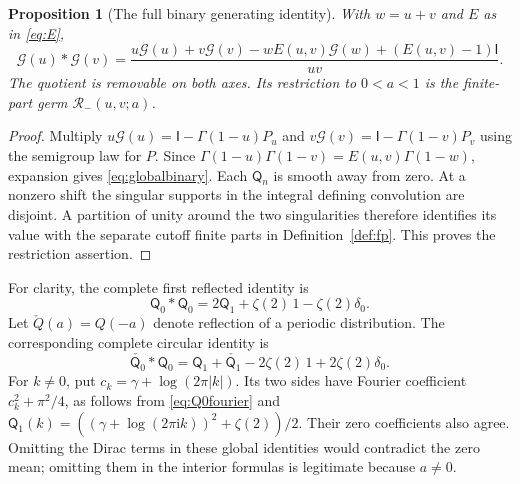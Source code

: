 \documentclass[11pt]{article}
\numberwithin{equation}{section}
\newtheorem{proposition}[theorem]{Proposition}
\theoremstyle{definition}\newtheorem{definition}[theorem]{Definition}
\theoremstyle{remark}\newtheorem{remark}[theorem]{Remark}
\newcommand{\iu}{\mathrm i}
\newcommand{\qn}[1]{\mathsf Q_{#1}}
\newcommand{\id}{\mathsf I}
\newcommand{\calG}{\mathcal G}
\newcommand{\calR}{\mathcal R}
\begin{document}
\begin{proposition}[The full binary generating identity]\label{prop:global}
With $w=u+v$ and $E$ as in \eqref{eq:E},
\begin{equation}\label{eq:globalbinary}
 \calG(u)*\calG(v)=
 \frac{u\calG(u)+v\calG(v)-wE(u,v)\calG(w)
                  +(E(u,v)-1)\id}{uv}.
\end{equation}
The quotient is removable on both axes. Its restriction to $0<a<1$
is the finite-part germ $\calR_-(u,v;a)$.
\end{proposition}
\begin{proof}
Multiply
$u\calG(u)=\id-\Gamma(1-u)P_u$ and
$v\calG(v)=\id-\Gamma(1-v)P_v$ using the semigroup law for $P$.
Since $\Gamma(1-u)\Gamma(1-v)=E(u,v)\Gamma(1-w)$, expansion gives
\eqref{eq:globalbinary}. Each $\qn n$ is smooth away from zero. At a
nonzero shift the singular supports in the integral defining convolution
are disjoint. A partition of unity around the two singularities therefore
identifies its value with the separate cutoff finite parts in
Definition~\ref{def:fp}. This proves the restriction assertion.
\end{proof}

For clarity, the complete first reflected identity is
\begin{equation}\label{eq:contactminus}
 \qn0*\qn0=2\qn1+\zeta(2)\,1-\zeta(2)\delta_0.
\end{equation}
Let $\check Q(a)=Q(-a)$ denote reflection of a periodic distribution.
The corresponding complete circular identity is
\begin{equation}\label{eq:contactplus}
 \check{\qn0}*\qn0
 =\qn1+\check{\qn1}-2\zeta(2)\,1+2\zeta(2)\delta_0.
\end{equation}
For $k\ne0$, put $c_k=\gamma+\log(2\pi|k|)$. Its two sides have
Fourier coefficient $c_k^2+\pi^2/4$, as follows from
\eqref{eq:Q0fourier} and
$\widehat{\qn1}(k)=((\gamma+\log(2\pi\iu k))^2+\zeta(2))/2$.
Their zero coefficients also agree. Omitting the Dirac terms in these
global identities would contradict the zero mean; omitting them in the
interior formulas is legitimate because $a\ne0$.
\end{document}
